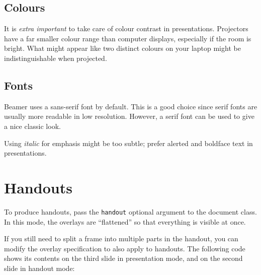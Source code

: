 %
%
\subsection{Colours}

\begin{practices}
It is \emph{extra important} to take care of colour contrast in presentations.
Projectors have a far smaller colour range than computer displays,
especially if the room is bright.
What might appear like two distinct colours on your laptop
might be indistinguishable when projected.
\end{practices}



\subsection{Fonts}

\begin{practices}
Beamer uses a sans-serif font by default.
This is a good choice since serif fonts are usually more readable in low resolution.
However, a serif font can be used to give a nice classic look.

Using \emph{italic} for emphasis might be too subtle;
prefer alerted and boldface text in presentations.
\end{practices}


%
%
\section{Handouts}

To produce handouts, pass the \verb|handout| optional argument to the document class.
In this mode, the overlays are ``flattened'' so that everything is visible at once.

If you still need to split a frame into multiple parts in the handout,
you can modify the overlay specification to also apply to handouts.
The following code shows its contents on the third slide in presentation mode,
and on the second slide in handout mode:
\begin{ExampleCode}
\end{ExampleCode}

